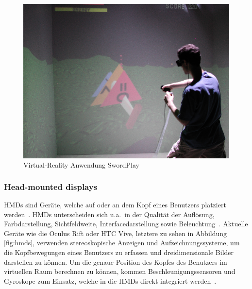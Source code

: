 \begin{figure}[h]
\captionsetup{width=.7\linewidth}
\includegraphics[scale=0.5]{Bilder/Hauptteil/virtualreality}
\centering
\caption{Virtual-Reality Anwendung SwordPlay~\cite{anintroductionto3dspacial}}
\label{fig:vranwendung}
\end{figure}

\subsubsection{Head-mounted displays}
HMDs sind Geräte, welche auf oder an dem Kopf eines Benutzers platziert werden~\cite{hmds}. HMDs unterscheiden sich u.a.~in der Qualität der Auflösung, Farbdarstellung, Sichtfeldweite, Interfacedarstellung sowie Beleuchtung~\cite{hmdsinmedicine}. Aktuelle Geräte wie die Oculus Rift oder HTC Vive, letztere zu sehen in Abbildung \ref{fig:hmds}, verwenden stereoskopische Anzeigen und Aufzeichnungssysteme, um die Kopfbewegungen eines Benutzers zu erfassen und dreidimensionale Bilder darstellen zu können. Um die genaue Position des Kopfes des Benutzers im virtuellen Raum berechnen zu können, kommen Beschleunigungssensoren und Gyroskope zum Einsatz, welche in die HMDs direkt integriert werden~\cite{hmds}.\\

